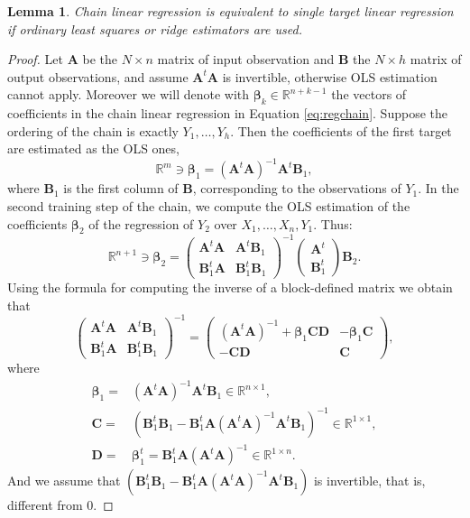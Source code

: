 \documentclass[11pt,a4paper, twoside]{book}
\newtheorem{lemma}{Lemma}[chapter]
\begin{document}
\begin{lemma}
\label{lem:CRvsST}
Chain linear regression is equivalent to single target linear regression if ordinary least squares or ridge estimators are used.
\end{lemma}
\begin{proof}
{Let $\mathbf{A}$ be the $N\times n$ matrix of input observation and $\mathbf{B}$ the $N\times h$ matrix of output observations, and assume $\mathbf{A}^{t}\mathbf{A}$ is invertible, otherwise OLS estimation cannot apply. Moreover we will denote with $\bm{\beta}_{k} \in \mathbb{R}^{n+k-1}$ the vectors of coefficients in the chain linear regression in Equation \ref{eq:regchain}. 
Suppose the ordering of the chain is exactly $Y_1,\ldots,Y_h$. Then the coefficients of the first target are estimated as the OLS ones,
$$  \mathbb{R}^{m} \ni \bm{\beta}_1=\left( \mathbf{A}^{t}\mathbf{A} \right)^{-1}\mathbf{A}^{t}\mathbf{B}_{1},$$
where $\mathbf{B}_{1}$ is the first column of $\mathbf{B}$, corresponding to the observations of $Y_1$.
In the second training step of the chain, we compute the OLS estimation of the coefficients ${\bm \beta}_2$ of the regression of $Y_2$ over $X_1,\ldots,X_n,Y_1$. Thus:
$$    
\mathbb{R}^{n+1} \ni \bm{\beta}_2= \left( \begin{array}{c|c}
\bm{A}^{t}\bm{A} &  \bm{A}^{t}\bm{B}_{1} \\ \hline
\bm{B}_{1}^{t}\bm{A} & \bm{B}_{1}^{t}\bm{B}_{1}   
\end{array}  \right)^{-1} \left( 
\begin{array}{c}
\bm{A}^{t} \\ \hline
\bm{B}^t_1
\end{array}
\right)\bm{B}_2.
$$ 
Using the formula for computing the inverse of a block-defined matrix we obtain that
$$
\left( \begin{array}{c|c}
\bm{A}^{t}\bm{A} &  \bm{A}^{t}\bm{B}_{1} \\ \hline
\bm{B}_{1}^{t}\bm{A} & \bm{B}_{1}^{t}\bm{B}_{1}   
\end{array}  \right)^{-1}=
\left( 
\begin{array}{c|c}
(\bm{A}^{t}\bm{A})^{-1} + \bm{\beta}_1\bm{C}\bm{D} &  -\bm{\beta}_1\bm{C} \\ \hline
-\bm{C}\bm{D} & \bm{C}    
\end{array}  \right),
$$
where  \begin{align*}
\bm{\beta}_1 = &(\bm{A}^{t}\bm{A})^{-1}\bm{A}^{t}\bm{B}_1 \in \mathbb{R}^{n\times1},  \\  \bm{C} = &\left(\bm{B}_1^{t}\bm{B}_1-\bm{B}_1^{t}\bm{A}(\bm{A}^t\bm{A})^{-1}\bm{A}^t\bm{B}_1 \right)^{-1} \in \mathbb{R}^{1\times1}, \\ 
 \bm{D}=&\bm{\beta}_{1}^{t} = \bm{B}_1^{t}\bm{A}(\bm{A}^{t}\bm{A})^{-1} \in \mathbb{R}^{1 \times n}. 
 \end{align*}
And we assume that $\left(\bm{B}_1^{t}\bm{B}_1-\bm{B}_1^{t}\bm{A}(\bm{A}^t\bm{A})^{-1}\bm{A}^t\bm{B}_1 \right)$ is invertible, that is, different from $0$.} 


\end{proof}
\end{document}
